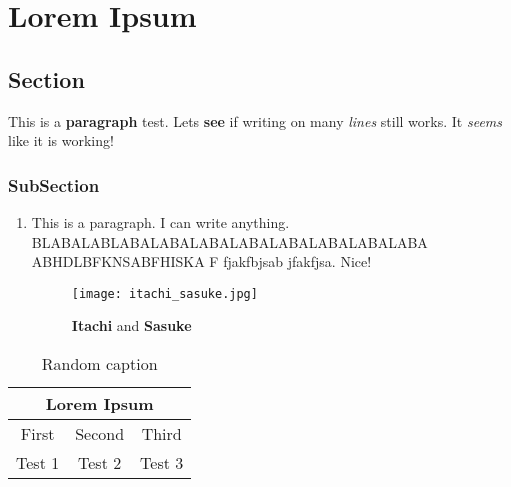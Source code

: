 \documentclass[12pt]{report}
\begin{document}
	\chapter{Lorem Ipsum}

		\section{Section}

			This is a \textbf{paragraph} test. Lets \textbf{see} if writing on many \textit{lines} still works. It \textit{seems} like it is working!

			\subsection*{SubSection}

				\begin{enumerate}

					\item
					This is a paragraph. I can write anything. BLABALABLABALABALABALABALABALABALABALABA ABHDLBFKNSABFHISKA F fjakfbjsab jfakfjsa. Nice!

					\begin{figure}[H]
						\centering
						\texttt{[image: itachi\_sasuke.jpg]}
						\caption{\textbf{Itachi} and \textbf{Sasuke}}
					\end{figure}

				\end{enumerate}

			\begin{table}[H]
				\centering
				\begin{tabular}{|c|c|c|}
					\hline
					\multicolumn{3}{|c|}{\textbf{Lorem Ipsum}} \\
					\hline
					First & Second & Third \\
					\hline
					Test 1 & Test 2 & Test 3 \\
					\hline
				\end{tabular}
				\caption{Random caption}
			\end{table}
\end{document}
